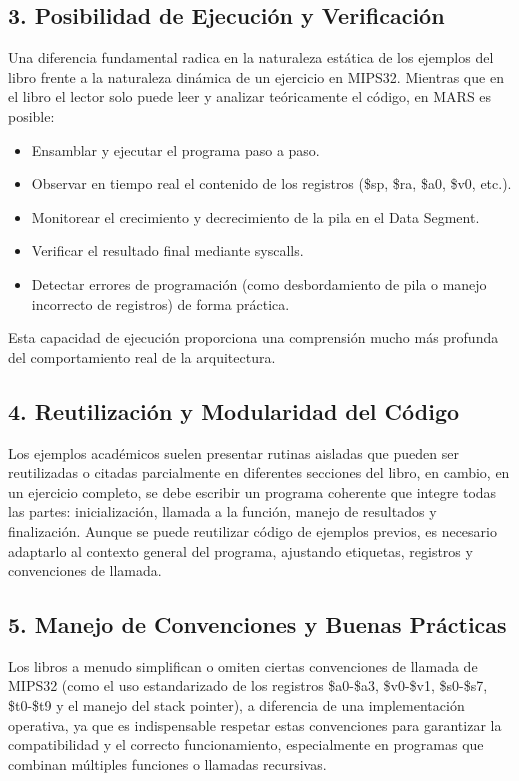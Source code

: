 \documentclass[12pt, letterpaper]{article}
\begin{document}
\subsection*{3. Posibilidad de Ejecución y Verificación}

Una diferencia fundamental radica en la naturaleza estática de los ejemplos del libro frente a la naturaleza dinámica de un ejercicio en MIPS32. Mientras que en el libro el lector solo puede leer y analizar teóricamente el código, en MARS es posible:

\begin{itemize}
    \item Ensamblar y ejecutar el programa paso a paso.
    \item Observar en tiempo real el contenido de los registros (\$sp, \$ra, \$a0, \$v0, etc.).
    \item Monitorear el crecimiento y decrecimiento de la pila en el Data Segment.
    \item Verificar el resultado final mediante syscalls.
    \item Detectar errores de programación (como desbordamiento de pila o manejo incorrecto de registros) de forma práctica.
\end{itemize}

Esta capacidad de ejecución proporciona una comprensión mucho más profunda del comportamiento real de la arquitectura.

\subsection*{4. Reutilización y Modularidad del Código}

Los ejemplos académicos suelen presentar rutinas aisladas que pueden ser reutilizadas o citadas parcialmente en diferentes secciones del libro, en cambio, en un ejercicio completo, se debe escribir un programa coherente que integre todas las partes: inicialización, llamada a la función, manejo de resultados y finalización. Aunque se puede reutilizar código de ejemplos previos, es necesario adaptarlo al contexto general del programa, ajustando etiquetas, registros y convenciones de llamada.

\subsection*{5. Manejo de Convenciones y Buenas Prácticas}

Los libros a menudo simplifican o omiten ciertas convenciones de llamada de MIPS32 (como el uso estandarizado de los registros \$a0-\$a3, \$v0-\$v1, \$s0-\$s7, \$t0-\$t9 y el manejo del stack pointer), a diferencia de una implementación operativa, ya que es indispensable respetar estas convenciones para garantizar la compatibilidad y el correcto funcionamiento, especialmente en programas que combinan múltiples funciones o llamadas recursivas.
\end{document}
